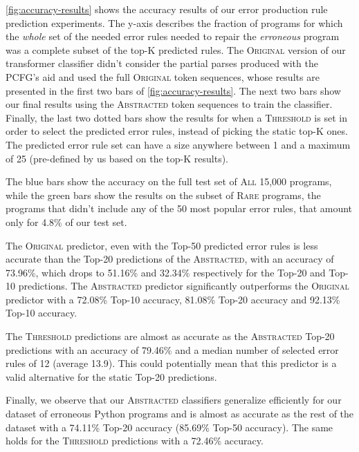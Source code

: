 

%
\autoref{fig:accuracy-results} shows the accuracy results of our error
production rule prediction experiments. The y-axis describes the fraction of
programs for which the \emph{whole} set of the needed error rules needed to
repair the \emph{erroneous} program was a complete subset of the top-K predicted
rules.
%
The \textsc{Original} version of our transformer classifier didn't consider the
partial parses produced with the PCFG's aid and used the full \textsc{Original}
token sequences, whose results are presented in the first two bars of
\autoref{fig:accuracy-results}. The next two bars show our final results using
the \textsc{Abstracted} token sequences to train the classifier. Finally, the
last two dotted bars show the results for when a \textsc{Threshold} is set in
order to select the predicted error rules, instead of picking the static top-K
ones. The predicted error rule set can have a size anywhere between 1 and a
maximum of 25 (pre-defined by us based on the top-K results).

The blue bars show the accuracy on the full test set of \textsc{All} 15,000
programs, while the green bars show the results on the subset of \textsc{Rare}
programs, \ie the programs that didn't include any of the 50 most popular error
rules, that amount only for 4.8\% of our test set.

The \textsc{Original} predictor, even with the Top-50 predicted error rules is
less accurate than the Top-20 predictions of the \textsc{Abstracted}, with an
accuracy of 73.96\%, which drops to 51.16\% and 32.34\% respectively for the
Top-20 and Top-10 predictions. The \textsc{Abstracted} predictor significantly
outperforms the \textsc{Original} predictor with a 72.08\% Top-10 accuracy,
81.08\% Top-20 accuracy and 92.13\% Top-10 accuracy.

The \textsc{Threshold} predictions are almost as accurate as the
\textsc{Abstracted} Top-20 predictions with an accuracy of 79.46\% and a median
number of selected error rules of 12 (average 13.9). This could potentially mean
that this predictor is a valid alternative for the static Top-20 predictions.

Finally, we observe that our \textsc{Abstracted} classifiers generalize
efficiently for our dataset of erroneous Python programs and is almost as
accurate as the rest of the dataset with a 74.11\% Top-20 accuracy (85.69\%
Top-50 accuracy). The same holds for the \textsc{Threshold} predictions with a
72.46\% accuracy.

